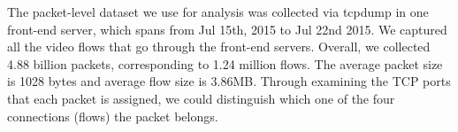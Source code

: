 
\iffalse
\begin{figure}[ht]
	\centering
	\texttt{[image: frame]}
	\caption{An overview of H.264 frame.}
	\label{fig:frame}
	\termspace
\end{figure}
\fi

The packet-level dataset we use for analysis was collected via tcpdump in one front-end server, which spans from Jul 15th, 2015 to Jul 22nd 2015. We captured all the video flows that go through the front-end servers. Overall, we collected 4.88 billion packets, corresponding to 1.24 million flows. The average packet size is 1028 bytes and average flow size is 3.86MB. Through examining the TCP ports that each packet is assigned, we could distinguish which one of the four connections (flows) the packet belongs. 